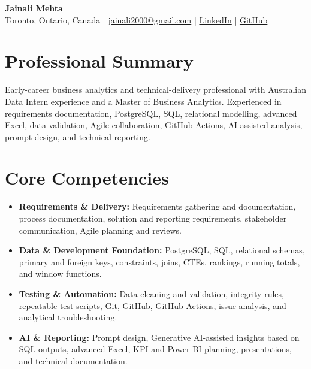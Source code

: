 \documentclass[letterpaper,10pt]{article}
\begin{document}
\begin{center}
  {\fontsize{17}{19}\selectfont\textbf{Jainali Mehta}}\\[2pt]
  \small Toronto, Ontario, Canada \;|\;
  \href{mailto:jainali2000@gmail.com}{jainali2000@gmail.com} \;|\;
  \href{https://www.linkedin.com/in/jainali-mehta}{LinkedIn} \;|\;
  \href{https://github.com/jainalimehta}{GitHub}
\end{center}
\vspace{-7pt}

\section{Professional Summary}
\small Early-career business analytics and technical-delivery professional with Australian Data Intern experience and a Master of Business Analytics. Experienced in requirements documentation, PostgreSQL, SQL, relational modelling, advanced Excel, data validation, Agile collaboration, GitHub Actions, AI-assisted analysis, prompt design, and technical reporting.

\section{Core Competencies}
\begin{itemize}[leftmargin=0.16in,label=\textbullet,topsep=0pt,itemsep=1pt,parsep=0pt]
  \item \small \textbf{Requirements \& Delivery:} Requirements gathering and documentation, process documentation, solution and reporting requirements, stakeholder communication, Agile planning and reviews.
  \item \small \textbf{Data \& Development Foundation:} PostgreSQL, SQL, relational schemas, primary and foreign keys, constraints, joins, CTEs, rankings, running totals, and window functions.
  \item \small \textbf{Testing \& Automation:} Data cleaning and validation, integrity rules, repeatable test scripts, Git, GitHub, GitHub Actions, issue analysis, and analytical troubleshooting.
  \item \small \textbf{AI \& Reporting:} Prompt design, Generative AI-assisted insights based on SQL outputs, advanced Excel, KPI and Power BI planning, presentations, and technical documentation.
\end{itemize}
\end{document}

